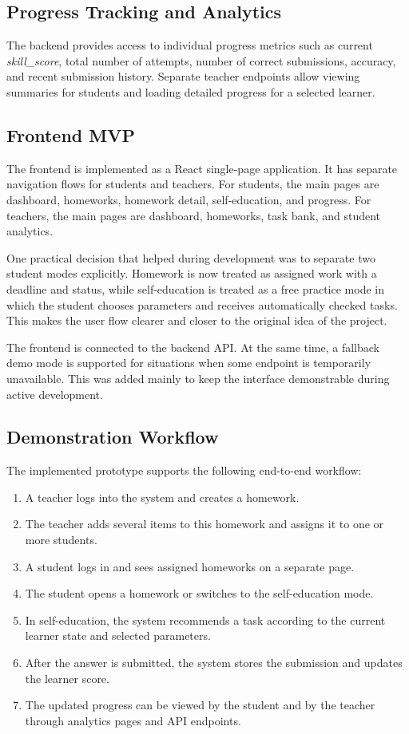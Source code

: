 \documentclass[a4paper,12pt]{extarticle}
\begin{document}
\subsection{Progress Tracking and Analytics}

The backend provides access to individual progress metrics such as current \textit{skill\_score}, total number of attempts, number of correct submissions, accuracy, and recent submission history. Separate teacher endpoints allow viewing summaries for students and loading detailed progress for a selected learner.

\subsection{Frontend MVP}

The frontend is implemented as a React single-page application. It has separate navigation flows for students and teachers. For students, the main pages are dashboard, homeworks, homework detail, self-education, and progress. For teachers, the main pages are dashboard, homeworks, task bank, and student analytics.

One practical decision that helped during development was to separate two student modes explicitly. Homework is now treated as assigned work with a deadline and status, while self-education is treated as a free practice mode in which the student chooses parameters and receives automatically checked tasks. This makes the user flow clearer and closer to the original idea of the project.

The frontend is connected to the backend API. At the same time, a fallback demo mode is supported for situations when some endpoint is temporarily unavailable. This was added mainly to keep the interface demonstrable during active development.

\subsection{Demonstration Workflow}

The implemented prototype supports the following end-to-end workflow:

\begin{enumerate}
    \item A teacher logs into the system and creates a homework.
    \item The teacher adds several items to this homework and assigns it to one or more students.
    \item A student logs in and sees assigned homeworks on a separate page.
    \item The student opens a homework or switches to the self-education mode.
    \item In self-education, the system recommends a task according to the current learner state and selected parameters.
    \item After the answer is submitted, the system stores the submission and updates the learner score.
    \item The updated progress can be viewed by the student and by the teacher through analytics pages and API endpoints.
\end{enumerate}
\end{document}

